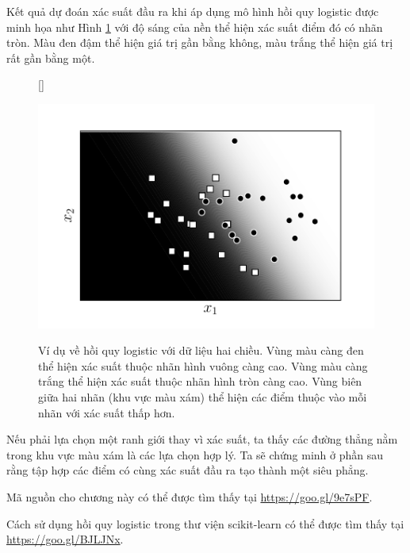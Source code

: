 Kết quả dự đoán xác suất đầu ra khi áp dụng mô hình hồi quy logistic được minh họa như Hình
\ref{fig:10_7} với độ sáng của nền thể hiện xác suất điểm đó có nhãn tròn. Màu đen
đậm thể hiện giá trị gần bằng không, màu trắng thể hiện giá trị rất gần bằng một.

\begin{figure}[t]
[\FBwidth]
{\caption{
Ví dụ về hồi quy logistic với dữ liệu hai chiều. Vùng màu càng đen thể hiện xác suất thuộc nhãn hình vuông càng cao. Vùng màu càng trắng thể hiện xác suất thuộc nhãn hình tròn càng cao. Vùng biên giữa hai nhãn (khu vực màu xám) thể hiện các điểm thuộc vào mỗi nhãn với xác suất thấp hơn.    }
\label{fig:10_7}}
{ %
\includegraphics[width=.5\textwidth]{ebookML_src/src/logistic_regression/logistic_2d_2.pdf}
}
\end{figure}

Nếu phải lựa chọn một ranh giới thay vì xác suất, ta thấy các đường thẳng nằm
trong khu vực màu xám là các lựa chọn hợp lý. Ta sẽ chứng minh ở phần sau rằng
tập hợp các điểm có cùng xác suất đầu ra tạo thành một siêu phẳng.

Mã nguồn cho chương này có thể được tìm thấy tại
\url{https://goo.gl/9e7sPF}.

Cách sử dụng hồi quy logistic trong thư viện scikit-learn có thể được tìm thấy tại \url{https://goo.gl/BJLJNx}.


